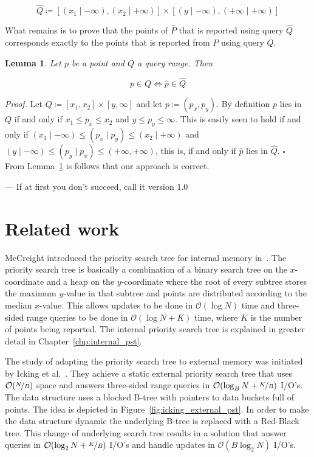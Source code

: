 \documentclass[twoside,11pt,openright]{report}
\newtheorem{lemma}{Lemma}
\begin{document}
$$ \hat{Q} \coloneqq [(x_1 \mid -\infty), (x_2 \mid +\infty)] \times [(y \mid -\infty),(+\infty \mid +\infty)] $$

What remains is to prove that the points of $\hat{P}$ that is reported using query $\hat{Q}$ corresponds exactly to the points that is reported from $P$ using query $Q$.

\begin{lemma}
\label{lma:composite_universe_query}
Let $p$ be a point and $Q$ a query range. Then

$$ p \in Q \Leftrightarrow \hat{p} \in \hat{Q} $$
\end{lemma}

\textit{Proof.} Let $Q \coloneqq [x_1, x_2] \times [y, \infty]$ and let $p \coloneqq (p_x,p_y)$. By definition $p$ lies in $Q$ if and only if $x_1 \leq p_x \leq x_2$ and $y \leq p_y \leq \infty$. This is easily seen to hold if and only if $(x_1 \mid -\infty) \leq (p_x \mid p_y) \leq (x_2 \mid +\infty)$ and $(y \mid -\infty) \leq (p_y \mid p_x) \leq (+\infty, +\infty)$, this is, if and only if $\hat{p}$ lies in $\hat{Q}$. $\square$ \\

From Lemma~\ref{lma:composite_universe_query} is follows that our approach is correct.

\begin{savequote}[0.5\textwidth]
--- If at first you don't succeed, call it version 1.0
\end{savequote}
\chapter{Related work}
\label{chp:related_work}
McCreight introduced the priority search tree for internal memory in~\cite{DBLP:journals/siamcomp/McCreight85}. The priority search tree is basically a combination of a binary search tree on the $x$-coordinate and a heap on the $y$-coordinate where the root of every subtree stores the maximum $y$-value in that subtree and points are distributed according to the median $x$-value. This allows updates to be done in $\mathcal{O}(\log N)$ time and three-sided range queries to be done in $\mathcal{O}(\log N + K)$ time, where $K$ is the number of points being reported. The internal priority search tree is explained in greater detail in Chapter~\ref{chp:internal_pst}.

The study of adapting the priority search tree to external memory was initiated by Icking et al.~\cite{Icking1988}. They achieve a static external priority search tree that uses $\mathcal{O}(\nicefrac{N}{B})$ space and answers three-sided range queries in $\mathcal{O}(\log_B N + \nicefrac{K}{B})$ I/O's. The data structure uses a blocked B-tree with pointers to data buckets full of points. The idea is depicted in Figure~\ref{fig:icking_external_pst}. In order to make the data structure dynamic the underlying B-tree is replaced with a Red-Black tree. This change of underlying search tree results in a solution that answer queries in $\mathcal{O}(\log_2 N + \nicefrac{K}{B})$ I/O's and handle updates in $\mathcal{O}(B \log_2 N)$ I/O's.
\end{document}
